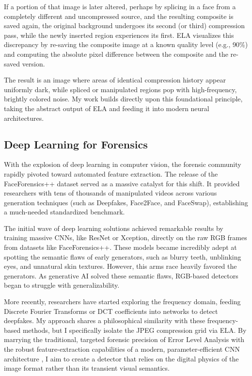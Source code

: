 If a portion of that image is later altered, perhaps by splicing in a face from a completely different and uncompressed source, and the resulting composite is saved again, the original background undergoes its second (or third) compression pass, while the newly inserted region experiences its first. ELA visualizes this discrepancy by re-saving the composite image at a known quality level (e.g., 90\%) and computing the absolute pixel difference between the composite and the re-saved version.

The result is an image where areas of identical compression history appear uniformly dark, while spliced or manipulated regions pop with high-frequency, brightly colored noise. My work builds directly upon this foundational principle, taking the abstract output of ELA and feeding it into modern neural architectures.

\subsection{Deep Learning for Forensics}

With the explosion of deep learning in computer vision, the forensic community rapidly pivoted toward automated feature extraction. The release of the FaceForensics++ dataset \cite{faceforensics} served as a massive catalyst for this shift. It provided researchers with tens of thousands of manipulated videos across various generation techniques (such as Deepfakes, Face2Face, and FaceSwap), establishing a much-needed standardized benchmark.

The initial wave of deep learning solutions achieved remarkable results by training massive CNNs, like ResNet or Xception, directly on the raw RGB frames from datasets like FaceForensics++. These models became incredibly adept at spotting the semantic flaws of early generators, such as blurry teeth, unblinking eyes, and unnatural skin textures. However, this arms race heavily favored the generators. As generative AI solved these semantic flaws, RGB-based detectors began to struggle with generalizability.

More recently, researchers have started exploring the frequency domain, feeding Discrete Fourier Transforms or DCT coefficients into networks to detect deepfakes. My approach shares a philosophical similarity with these frequency-based methods, but I specifically isolate the JPEG compression grid via ELA. By marrying the traditional, targeted forensic precision of Error Level Analysis with the robust feature-extraction capabilities of a modern, parameter-efficient CNN architecture \cite{efficientnet}, I aim to create a detector that relies on the digital physics of the image format rather than its transient visual semantics.
